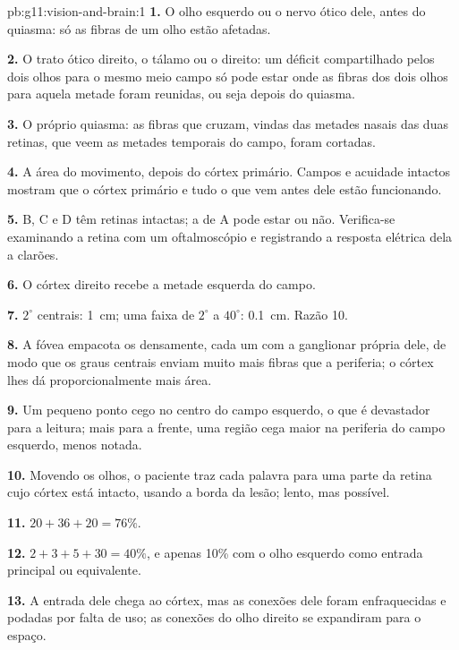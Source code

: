 \begin{solution}{pb:g11:vision-and-brain:1}
\textbf{1.} O olho esquerdo ou o nervo ótico dele, antes do quiasma:
só as fibras de um olho estão afetadas.

\textbf{2.} O trato ótico direito, o tálamo ou o 
direito: um déficit compartilhado pelos dois olhos para o mesmo meio
campo só pode estar onde as fibras dos dois olhos para aquela metade
foram reunidas, ou seja depois do quiasma.

\textbf{3.} O próprio quiasma: as fibras que cruzam, vindas das metades
nasais das duas retinas, que veem as metades temporais do campo, foram
cortadas.

\textbf{4.} A área do movimento, depois do córtex primário. Campos e
acuidade intactos mostram que o córtex primário e tudo o que vem antes
dele estão funcionando.

\textbf{5.} B, C e D têm retinas intactas; a de A pode estar ou não.
Verifica-se examinando a retina com um oftalmoscópio e registrando a
resposta elétrica dela a clarões.

\textbf{6.} O córtex direito recebe a metade esquerda do campo.

\textbf{7.} $2^\circ$ centrais: \qty{1}{cm}; uma faixa de $2^\circ$ a
$40^\circ$: \qty{0.1}{cm}. Razão 10.

\textbf{8.} A fóvea empacota os  densamente, cada um com a 
ganglionar própria dele, de modo que os graus centrais enviam muito
mais fibras que a periferia; o córtex lhes dá proporcionalmente mais
área.

\textbf{9.} Um pequeno ponto cego no centro do campo esquerdo, o que é
devastador para a leitura; mais para a frente, uma região cega maior na
periferia do campo esquerdo, menos notada.

\textbf{10.} Movendo os olhos, o paciente traz cada palavra para uma
parte da retina cujo córtex está intacto, usando a borda da lesão;
lento, mas possível.

\textbf{11.} $20 + 36 + 20 = 76\%$.

\textbf{12.} $2 + 3 + 5 + 30 = 40\%$, e apenas 10\% com o olho esquerdo
como entrada principal ou equivalente.

\textbf{13.} A entrada dele chega ao córtex, mas as conexões dele foram
enfraquecidas e podadas por falta de uso; as conexões do olho direito
se expandiram para o espaço.


\end{solution}
